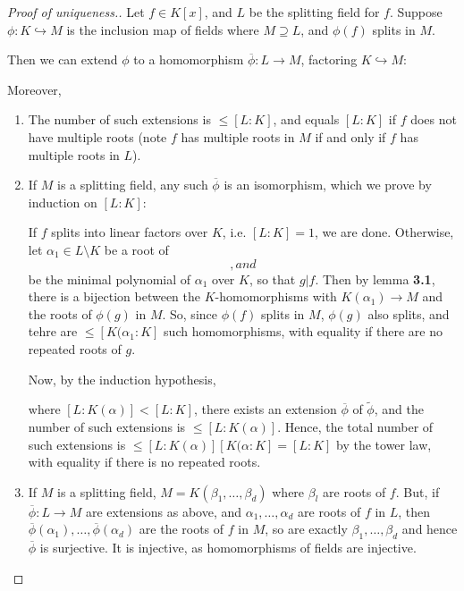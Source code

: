 \documentclass[10pt,a4paper]{article}
\begin{document}
\begin{proof}[Proof of uniqueness.]
Let $f\in K[x]$, and $L$ be the splitting field for $f$. Suppose $\phi:K\hookrightarrow M$ is the inclusion map of fields where $M\supseteq L$, and $\phi(f)$ splits in $M$.

Then we can extend $\phi$ to a homomorphism  $\overline{\phi}:L\rightarrow M$, factoring $K\hookrightarrow M$:
\begin{center}
\end{center}
Moreover,
\begin{enumerate}
\item The number of such extensions is $\leq [L:K]$, and equals $[L:K]$ if $f$ does not have multiple roots (note $f$ has multiple roots in $M$ if and only if $f$ has multiple roots in $L$).
\item If $M$ is a splitting field, any such $\overline{\phi}$ is an isomorphism, which we prove by induction on $[L:K]$:

If $f$ splits into linear factors over $K$, i.e. $[L:K] = 1$, we are done. Otherwise, let $\alpha_1 \in L\setminus K$ be a root of $$, and $$ be the minimal polynomial of $\alpha_1$ over $K$, so that $g|f$. Then by lemma \textbf{3.1}, there is a bijection between the $K$-homomorphisms with $K(\alpha_1) \rightarrow M$ and the roots of $\phi(g)$ in $M$. So, since $\phi(f)$ splits in $M$, $\phi(g)$ also splits, and tehre are $\leq [K(\alpha_1:K]$ such homomorphisms, with equality if there are no repeated roots of $g$.

Now, by the induction hypothesis, 
\begin{center}
\end{center}
where $[L:K(\alpha)] < [L:K]$, there exists an extension $\overline{\phi}$ of $\tilde{\phi}$, and the number of such extensions is $\leq [L:K(\alpha)]$. Hence, the total number of such extensions is $\leq [L:K(\alpha)][K(\alpha:K] = [L:K]$ by the tower law, with equality if there is no repeated roots.

\item If $M$ is a splitting field, $M = K(\beta_1, \ldots, \beta_d)$ where $\beta_l$ are roots of $f$. But, if $\overline{\phi}:L\rightarrow M$ are extensions as above, and $\alpha_1, \ldots, \alpha_d$ are roots of $f$ in $L$, then $\overline{\phi}(\alpha_1), \ldots, \overline{\phi}(\alpha_d)$ are the roots of $f$ in $M$, so are exactly $\beta_1, \ldots, \beta_d$ and hence $\overline{\phi}$ is surjective. It is injective, as homomorphisms of fields are injective.
\end{enumerate}
\end{proof}
\end{document}
